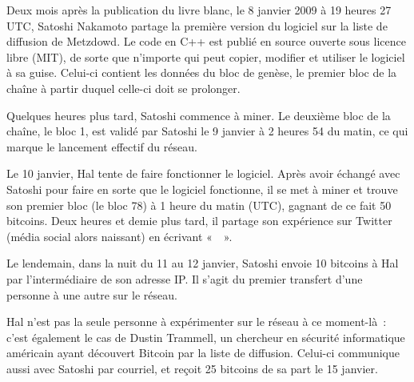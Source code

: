 
Deux mois après la publication du livre blanc, le 8 janvier 2009 à 19 heures 27 UTC, Satoshi Nakamoto partage la première version du logiciel sur la liste de diffusion de Metzdowd. Le code en C++ est publié en source ouverte sous licence libre (MIT), de sorte que n'importe qui peut copier, modifier et utiliser le logiciel à sa guise. Celui-ci contient les données du bloc de genèse, le premier bloc de la chaîne à partir duquel celle-ci doit se prolonger. 

Quelques heures plus tard, Satoshi commence à miner. Le deuxième bloc de la chaîne, le bloc 1, est validé par Satoshi le 9 janvier à 2 heures 54 du matin, ce qui marque le lancement effectif du réseau.

Le 10 janvier, Hal tente de faire fonctionner le logiciel. Après avoir échangé avec Satoshi pour faire en sorte que le logiciel fonctionne, il se met à miner et trouve son premier bloc (le bloc 78) à 1 heure du matin (UTC), gagnant de ce fait 50 bitcoins. Deux heures et demie plus tard, il partage son expérience sur Twitter (média social alors naissant) en écrivant «~~».

Le lendemain, dans la nuit du 11 au 12 janvier, Satoshi envoie 10 bitcoins à Hal par l'intermédiaire de son adresse IP. Il s'agit du premier transfert d'une personne à une autre sur le réseau.

Hal n'est pas la seule personne à expérimenter sur le réseau à ce moment-là~: c'est également le cas de Dustin Trammell, un chercheur en sécurité informatique américain ayant découvert Bitcoin par la liste de diffusion. Celui-ci communique aussi avec Satoshi par courriel, et reçoit 25 bitcoins de sa part le 15 janvier.

